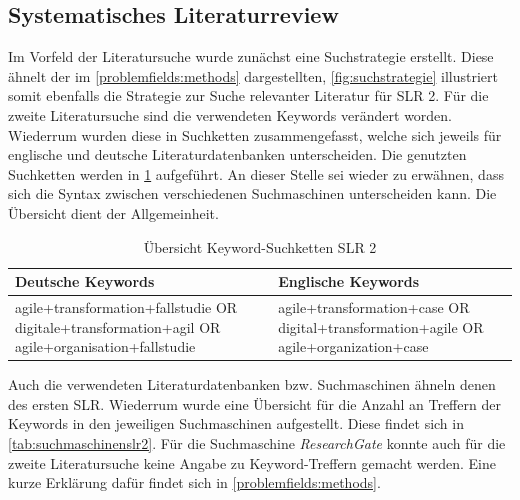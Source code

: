 \subsection{Systematisches Literaturreview}

Im Vorfeld der Literatursuche wurde zunächst eine Suchstrategie erstellt. Diese ähnelt der im \ref{problemfields:methods} dargestellten, \ref{fig:suchstrategie} illustriert somit ebenfalls die Strategie zur Suche relevanter Literatur für SLR 2. Für die zweite Literatursuche sind die verwendeten Keywords verändert worden. Wiederrum wurden diese in Suchketten zusammengefasst, welche sich jeweils für englische und deutsche Literaturdatenbanken unterscheiden. Die genutzten Suchketten werden in \ref{tab:keywordsslr2} aufgeführt. An dieser Stelle sei wieder zu erwähnen, dass sich die Syntax zwischen verschiedenen Suchmaschinen unterscheiden kann. Die Übersicht dient der Allgemeinheit.

\begin{table}[ht]
	\centering
	\caption{Übersicht Keyword-Suchketten SLR 2}
	\begin{tabular}{|p{7cm}|p{7cm}|}
		\hline
		\textbf{Deutsche Keywords}& \textbf{Englische Keywords} \\
		\hline
		agile+transformation+fallstudie OR digitale+transformation+agil OR agile+organisation+fallstudie   & agile+transformation+case OR digital+transformation+agile OR agile+organization+case \\
		\hline
	\end{tabular}
	\label{tab:keywordsslr2}
\end{table}

Auch die verwendeten Literaturdatenbanken bzw. Suchmaschinen ähneln denen des ersten SLR. Wiederrum wurde eine Übersicht für die Anzahl an Treffern der Keywords in den jeweiligen Suchmaschinen aufgestellt. Diese findet sich in \ref{tab:suchmaschinenslr2}. Für die Suchmaschine \textit{ResearchGate} konnte auch für die zweite Literatursuche keine Angabe zu Keyword-Treffern gemacht werden. Eine kurze Erklärung dafür findet sich in \ref{problemfields:methods}.

